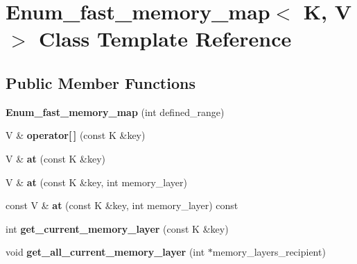 \hypertarget{classEnum__fast__memory__map}{}\section{Enum\+\_\+fast\+\_\+memory\+\_\+map$<$ K, V $>$ Class Template Reference}
\label{classEnum__fast__memory__map}
\subsection*{Public Member Functions}
\begin{DoxyCompactItemize}
\item 
\mbox{\label{classEnum__fast__memory__map_a5768f2fe09e8b6b28524e5d57e528db4}} 
{\bfseries Enum\+\_\+fast\+\_\+memory\+\_\+map} (int defined\+\_\+range)
\item 
\mbox{\label{classEnum__fast__memory__map_aabda7589988ec4ba12e534824bac1a0b}} 
V \& {\bfseries operator\mbox{[}$\,$\mbox{]}} (const K \&key)
\item 
\mbox{\label{classEnum__fast__memory__map_a8be7bd8e594d849c4a4e72962d1b9d08}} 
V \& {\bfseries at} (const K \&key)
\item 
\mbox{\label{classEnum__fast__memory__map_a405c1341fdd7e71f177d5cec26b7d5a4}} 
V \& {\bfseries at} (const K \&key, int memory\+\_\+layer)
\item 
\mbox{\label{classEnum__fast__memory__map_afe6a230119ff19eb56811e15855020b1}} 
const V \& {\bfseries at} (const K \&key, int memory\+\_\+layer) const
\item 
\mbox{\label{classEnum__fast__memory__map_a4ea2b110272ea18098050e4c155d5de8}} 
int {\bfseries get\+\_\+current\+\_\+memory\+\_\+layer} (const K \&key)
\item 
\mbox{\label{classEnum__fast__memory__map_ac8c698a71ed90c3f1777f0b5f5ebc2d0}} 
void {\bfseries get\+\_\+all\+\_\+current\+\_\+memory\+\_\+layer} (int $\ast$memory\+\_\+layers\+\_\+recipient)
\item 

\end{DoxyCompactItemize}
